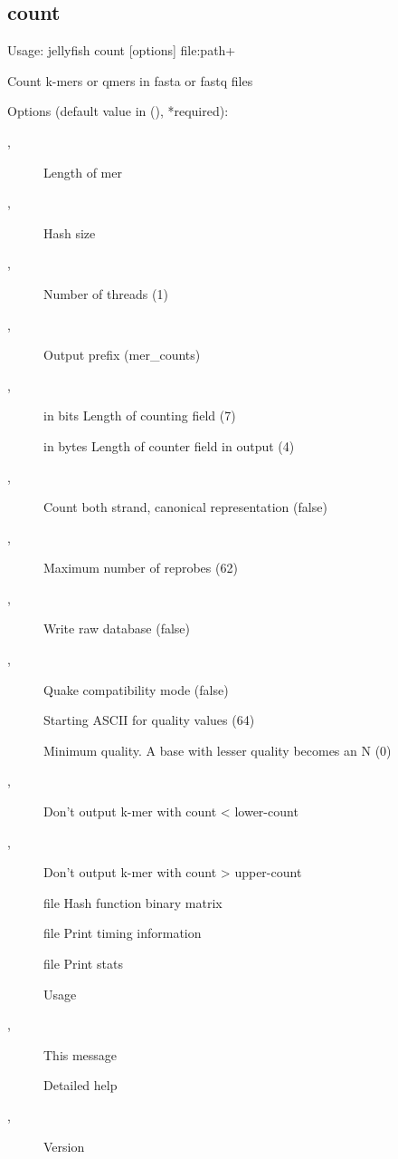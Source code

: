 \subsection{count}
\noindent Usage: jellyfish count [options] file:path+

\noindent Count k-mers or qmers in fasta or fastq files

\noindent Options (default value in (), *required):
\begin{description}
\item[,] \noindent *Length of mer
\item[,] \noindent *Hash size
\item[,] \noindent Number of threads (1)
\item[,] \noindent Output prefix (mer\_counts)
\item[,] \noindent in bits         Length of counting field (7)
\item[] \noindent in bytes    Length of counter field in output (4)
\item[,] \noindent Count both strand, canonical representation (false)
\item[,] \noindent Maximum number of reprobes (62)
\item[,] \noindent Write raw database (false)
\item[,] \noindent Quake compatibility mode (false)
\item[] \noindent Starting ASCII for quality values (64)
\item[] \noindent Minimum quality. A base with lesser quality becomes an N (0)
\item[,] \noindent Don't output k-mer with count < lower-count
\item[,] \noindent Don't output k-mer with count > upper-count
\item[] \noindent file                 Hash function binary matrix
\item[] \noindent file                 Print timing information
\item[] \noindent file                   Print stats
\item[] \noindent Usage
\item[,] \noindent This message
\item[] \noindent Detailed help
\item[,] \noindent Version
\end{description}

